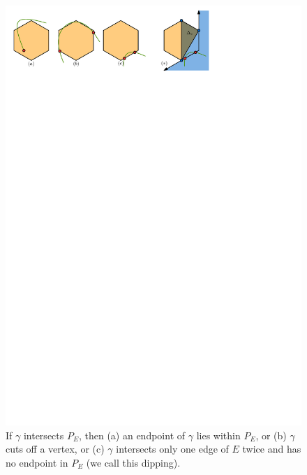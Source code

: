 \documentclass[a4paper, UKenglish]{paper}
\begin{document}
\begin{figure}[h]
    \centering
    \includegraphics{../intersectionsearch}
    \caption{If $\gamma$ intersects $P_E$, then (a) an endpoint of $\gamma$ lies within $P_E$, or (b) $\gamma$ cuts off a vertex, or (c) $\gamma$ intersects only one edge of $E$ twice and has no endpoint in $P_E$ (we call this dipping).}
    \label{fig:intersectionsearch}
\end{figure}
\end{document}
